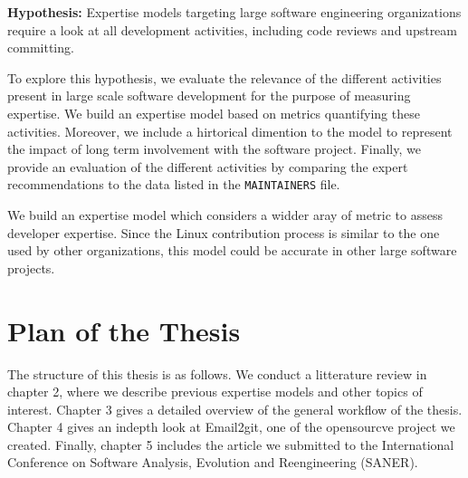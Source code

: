 \textbf{Hypothesis:} Expertise models targeting large software engineering organizations require a look at all development activities, including code reviews and upstream committing.



To explore this hypothesis, we evaluate the relevance of the different activities present in large scale software development for the purpose of measuring expertise. We build an expertise model based on metrics quantifying these activities. Moreover, we include a hirtorical dimention to the model to represent the impact of long term involvement with the software project. Finally, we provide an evaluation of the different activities by comparing the expert recommendations to the data listed in the \texttt{MAINTAINERS} file.

We build an expertise model which considers a widder aray of metric to assess developer expertise. Since the Linux contribution process is similar to the one used by other organizations, this model could be accurate in other large software projects. 




\section{Plan of the Thesis}


The structure of this thesis is as follows. We conduct a litterature review in chapter 2, where we describe previous expertise models and other topics of interest. Chapter 3 gives a detailed overview of the general workflow of the thesis. Chapter 4 gives an indepth look at Email2git, one of the opensourcve project we created. Finally, chapter 5 includes the article we submitted to the  International Conference on Software Analysis, Evolution and Reengineering (SANER).




